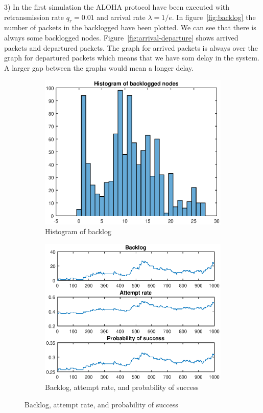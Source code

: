 \documentclass{article}
\begin{document}
3) In the first simulation the ALOHA protocol have been executed with retransmission rate $q_r=0.01$ and arrival rate $\lambda=1/e$. In figure~\ref{fig:backlog} the number of packets in the backlogged have been plotted. We can see that there is always some backlogged nodes. Figure~\ref{fig:arrival-departure} shows arrived packets and departured packets. The graph for arrived packets is always over the graph for departured packets which means that we have som delay in the system. A larger gap between the graphs would mean a longer delay.

\begin{figure}[h]
  \begin{subfigure}{.5\textwidth}
    \centering
    \includegraphics[width=\textwidth]{figures/hist-backlog.eps}
    \caption{Histogram of backlog}
    \label{fig:hist-backlog}
  \end{subfigure}%
  \begin{subfigure}{.5\textwidth}
    \centering
    \includegraphics[width=\textwidth]{figures/backlog-attempt-probsuccess.eps}
    \caption{Backlog, attempt rate, and probability of success}
    \label{fig:backlog-attempt-probsuccess}
  \end{subfigure}
\end{figure}
\end{document}
